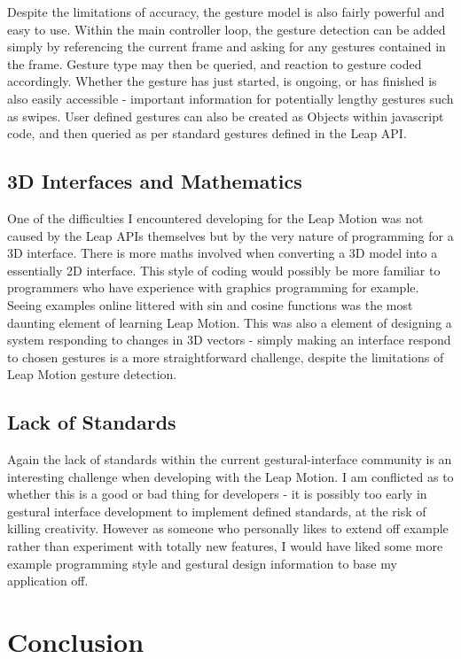\documentclass{sigplanconf}
\begin{document}
Despite the limitations of accuracy, the gesture model is also fairly powerful and easy to use. Within the main controller loop, the gesture detection can be added simply by referencing the current frame and asking for any gestures contained in the frame. Gesture type may then be queried, and reaction to gesture coded accordingly. Whether the gesture has just started, is ongoing, or has finished is also easily accessible - important information for potentially lengthy gestures such as swipes. User defined gestures can also be created as Objects within javascript code, and then queried as per standard gestures defined in the Leap API. 

\subsection{3D Interfaces and Mathematics}

One of the difficulties I encountered developing for the Leap Motion was not caused by the Leap APIs themselves but by the very nature of programming for a 3D interface. There is more maths involved when converting a 3D model into a essentially 2D interface. This style of coding would possibly be more familiar to programmers who have experience with graphics programming for example. Seeing examples online littered with sin and cosine functions was the most daunting element of learning Leap Motion. This was also a element of designing a system responding to changes in 3D vectors - simply making an interface respond to chosen gestures is a more straightforward challenge, despite the limitations of Leap Motion gesture detection.

\subsection{Lack of Standards}

Again the lack of standards within the current gestural-interface community is an interesting challenge when developing with the Leap Motion. I am conflicted as to whether this is a good or bad thing for developers - it is possibly too early in gestural interface development to implement defined standards, at the risk of killing creativity. However as someone who personally likes to extend off example rather than experiment with totally new features, I would have liked some more example programming style and gestural design information to base my application off.

\section{Conclusion}
\end{document}
